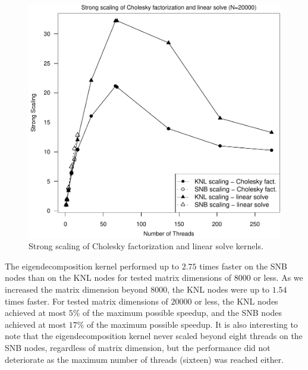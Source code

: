 \begin{figure}
\includegraphics[height=\columnwidth, width=\columnwidth]{chol_solve_20000_272-ss.pdf}
\caption{Strong scaling of Cholesky factorization and linear solve kernels.}
\label{fig:cholSolveScale}
\end{figure}

The eigendecomposition kernel performed up to $2.75$ times faster on
  the SNB nodes than on the KNL nodes for tested matrix dimensions of $8000$ or
  less.
As we increased the matrix dimension beyond $8000$, the KNL nodes
  were up to $1.54$ times faster.
For tested matrix dimensions of $20000$ or less, the KNL nodes
  achieved at most $5\%$ of the maximum possible speedup, and the SNB
  nodes achieved at most $17\%$ of the maximum possible speedup.
It is also interesting to note that the eigendecomposition kernel never scaled
  beyond eight threads on the SNB nodes, regardless of matrix dimension, but the
  performance did not deteriorate as the maximum number of threads (sixteen)
  was reached either.

